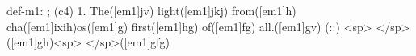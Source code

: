 def-m1: \grealign;
(c4) 1. The([em1]jv) light([em1]jkj) from([em1]h) cha([em1]ixih)os([em1]g) first([em1]hg) of([em1]fg) all.([em1]gv) (::) <sp> </sp>([em1]gh)<sp>   </sp>([em1]gfg)